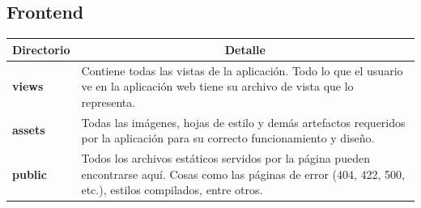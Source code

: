 \subsection{Frontend}

\begin{center}
  \begin{tabular}{ | l | p{12.5cm} |}
    \hline
    \multicolumn{1}{|c|}{\textbf{Directorio}} & \multicolumn{1}{|c|}{\textbf{Detalle}} \\
    \hline
    
    {\textbf{views}} & Contiene todas las vistas de la aplicación. Todo lo que el usuario ve en la aplicación web tiene su archivo de vista que lo representa. \\ \hline
    
    {\textbf{assets}} & Todas las imágenes, hojas de estilo y demás artefactos requeridos por la aplicación para su correcto funcionamiento y diseño. \\ \hline
    
    {\textbf{public}} & Todos los archivos estáticos servidos por la página pueden encontrarse aquí. Cosas como las páginas de error (404, 422, 500, etc.), estilos compilados, entre otros.\\ \hline
  \end{tabular}
  
  \label{table:frontend}
\end{center}
